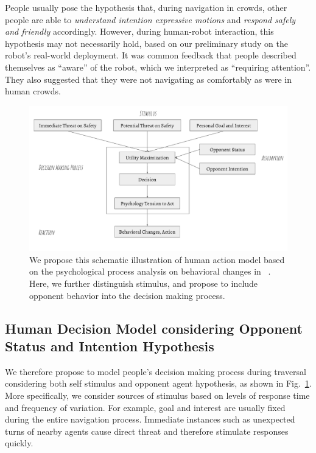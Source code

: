 \documentclass[conference]{IEEEtran}
\begin{document}
People usually pose the hypothesis that, during navigation in crowds, other 
people are able to \textit{understand intention expressive motions} and \textit{respond safely 
and friendly} 
accordingly. However, during human-robot interaction, this hypothesis may not 
necessarily hold, based on our preliminary study on the robot's real-world 
deployment. It was common feedback that people described themselves as 
``aware'' of the robot, which we interpreted as ``requiring attention''. They 
also suggested that they were not navigating as 
comfortably as were in human crowds.
\begin{figure}[tb]
  \begin{center}
  \hspace*{-2em}
    \includegraphics[width=1.05\columnwidth]{images/behavior_change.pdf}
  \hspace*{-2em}
  \vspace*{-1.5em}
  \end{center}
  \vspace{-0.05in}
  \caption{We propose this schematic illustration of human action model based 
    on the psychological process analysis on behavioral changes in ~\cite{helbing1995social}.
    Here, we further distinguish stimulus, and propose to include opponent 
    behavior into the decision making process.}
\vspace{-0.05in}
\label{fig:behavior}
\end{figure}
\vspace{-.3em}
\subsection{Human Decision Model considering Opponent Status and Intention Hypothesis}
We therefore propose to model people's decision making process during 
traversal considering both self stimulus and opponent agent hypothesis, as 
shown in Fig.~\ref{fig:behavior}. More specifically, we consider sources of 
stimulus based on levels of response time and frequency of variation. For 
example, goal and interest are usually fixed during the entire navigation 
process. Immediate instances such as unexpected turns of nearby agents cause 
direct threat and therefore stimulate responses quickly.
\end{document}
